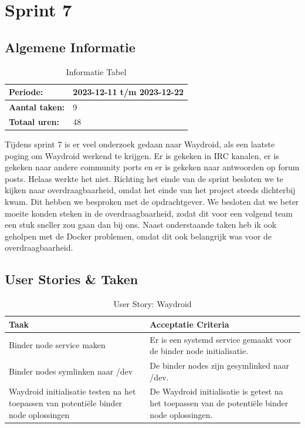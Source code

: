 \documentclass[a4paper]{report}
\newcommand{\userstorycolor}{PeachPuff1}
\begin{document}
  
\chapter{Sprint 7}
\section{Algemene Informatie}
\begin{table}[H]
\begin{tabularx}{0.6\textwidth}{|X|X|}
  \hline
  \cellcolor[HTML]{99ccff} \textbf{Periode:} & 2023-12-11 t/m 2023-12-22 \\ 
  \hline
  \cellcolor[HTML]{99ccff} \textbf{Aantal taken:} & 9 \\ 
  \hline
  \cellcolor[HTML]{99ccff} \textbf{Totaal uren:} & 48 \\ 
  \hline
\end{tabularx}
\caption{Informatie Tabel}
\label{table:it7:general}
\end{table}
Tijdens sprint 7 is er veel onderzoek gedaan naar Waydroid, als een laatste poging om Waydroid werkend te krijgen. Er is gekeken in IRC kanalen, er is gekeken naar andere community ports en er is gekeken naar antwoorden op forum posts. 
Helaas werkte het niet. Richting het einde van de sprint besloten we te kijken naar overdraagbaarheid, omdat het einde van het project steeds dichterbij kwam.
Dit hebben we besproken met de opdrachtgever. We besloten dat we beter moeite konden steken in de overdraagbaarheid, zodat dit voor een volgend team een stuk sneller zou gaan dan bij ons.
Naast onderstaande taken heb ik ook geholpen met de Docker problemen, omdat dit ook belangrijk was voor de overdraagbaarheid.

\section{User Stories \& Taken}
\begin{tcolorbox}[colback=white, coltitle=black, colframe=\userstorycolor, title=\textbf{User Story: }Als developer wil ik Waydroid als package kunnen bouwen\, zodat er android apps op de telefoon gerund kunnen worden.]
  \begin{table}[H]
      \centering
    \begin{tabularx}{1\textwidth}{|X|X|}
      \hline
      \cellcolor[HTML]{ffcc99} \textbf{Taak} & \cellcolor[HTML]{ffcc99} \textbf{Acceptatie Criteria} \\ 
      \hline 
      Binder node service maken & Er is een systemd service gemaakt voor de binder node initialisatie. \\ 
      \hline 
      Binder nodes symlinken naar /dev & De binder nodes zijn gesymlinked naar /dev. \\
      \hline 
      Waydroid initialisatie testen na het toepassen van potentiële binder node oplossingen & De Waydroid initialisatie is getest na het toepassen van de potentiële binder node oplossingen. \\
      \hline 
    \end{tabularx}
    \caption{User Story: Waydroid}
  \label{table:it7:story_waydroid}
  \end{table}
  \end{tcolorbox}
\end{document}
